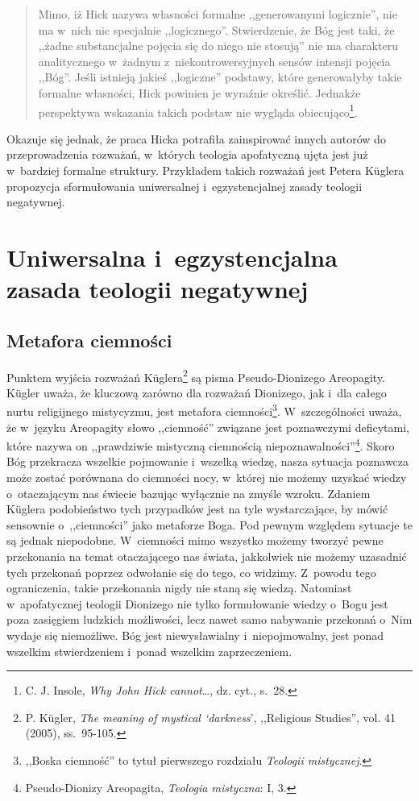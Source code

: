\begin{quote}
Mimo, iż Hick nazywa własności formalne ,,generowanymi logicznie'', nie ma w~nich nic specjalnie ,,logicznego''. Stwierdzenie, że Bóg jest taki, że ,,żadne substancjalne pojęcia się do niego nie stosują'' nie ma charakteru analitycznego w~żadnym z~niekontrowersyjnych sensów intensji pojęcia ,,Bóg''. Jeśli istnieją jakieś ,,logiczne'' podstawy, które generowałyby takie formalne własności, Hick powinien je wyraźnie określić. Jednakże perspektywa wskazania takich podstaw nie wygląda obiecująco\footnote{C. J. Insole, \textit{Why John Hick cannot}\ldots, dz. cyt., s.~28.}.
\end{quote}
Okazuje się jednak, że praca Hicka potrafiła zainspirować innych autorów do przeprowadzenia rozważań, w~których teologia apofatyczną ujęta jest już w~bardziej formalne struktury. Przykładem takich rozważań jest Petera Küglera propozycja sformułowania uniwersalnej i~egzystencjalnej zasady teologii negatywnej.


\chapter{Uniwersalna i~egzystencjalna zasada teologii negatywnej}


\section{Metafora ciemności}

Punktem wyjścia rozważań Küglera\footnote{P. Kügler, \textit{The meaning of mystical ‘darkness}', ,,Religious Studies'', vol. 41 (2005), ss.~95-105.} są pisma Pseudo-Dionizego Areopagity. Kügler uważa, że kluczową zarówno dla rozważań Dionizego, jak i~dla całego nurtu religijnego mistycyzmu, jest metafora ciemności\footnote{,,Boska ciemność'' to tytuł pierwszego rozdziału \textit{Teologii mistycznej}.}. W~szczególności uważa, że w~języku Areopagity słowo ,,ciemność'' związane jest poznawczymi deficytami, które nazywa on ,,prawdziwie mistyczną ciemnością niepoznawalności''\footnote{Pseudo-Dionizy Areopagita, \textit{Teologia mistyczna}: I, 3.}. Skoro Bóg przekracza wszelkie pojmowanie i~wszelką wiedzę, nasza sytuacja poznawcza może zostać porównana do ciemności nocy, w~której nie możemy uzyskać wiedzy o~otaczającym nas świecie bazując wyłącznie na zmyśle wzroku. Zdaniem Küglera podobieństwo tych przypadków jest na tyle wystarczające, by mówić sensownie o~,,ciemności'' jako metaforze Boga. Pod pewnym względem sytuacje te są jednak niepodobne. W~ciemności mimo wszystko możemy tworzyć pewne przekonania na temat otaczającego nas świata, jakkolwiek nie możemy uzasadnić tych przekonań poprzez odwołanie się do tego, co widzimy. Z~powodu tego ograniczenia, takie przekonania nigdy nie staną się wiedzą. Natomiast w~apofatycznej teologii Dionizego nie tylko formułowanie wiedzy o~Bogu jest poza zasięgiem ludzkich możliwości, lecz nawet samo nabywanie przekonań o~Nim wydaje się niemożliwe. Bóg jest niewysławialny i~niepojmowalny, jest ponad wszelkim stwierdzeniem i~ponad wszelkim zaprzeczeniem.

